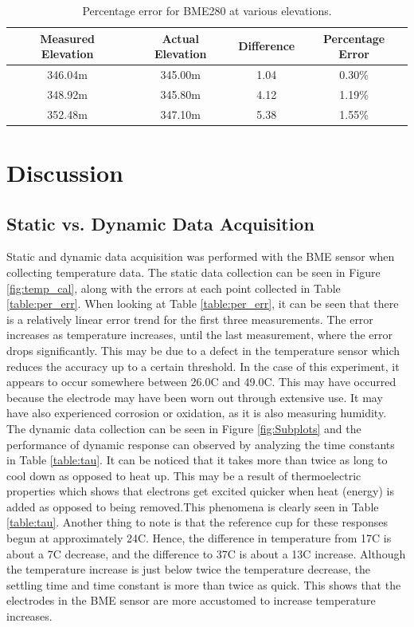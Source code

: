 \documentclass[11pt]{article}
\begin{document}
	\begin{table}[ht]
    \caption{Percentage error for BME280 at various elevations.}
	\vspace{3mm}
	\centering
	\begin{tabular}{cccc}
	\hline
		Measured Elevation & Actual Elevation & Difference & Percentage Error\\
	\hline
		346.04m & 345.00m & 1.04 & 0.30\%\\
		348.92m & 345.80m & 4.12 & 1.19\%\\
		352.48m & 347.10m & 5.38 & 1.55\%\\
	\hline
	\end{tabular}
	\label{table:per_err_e}
	\end{table}

\section{Discussion}
\subsection{Static vs. Dynamic Data Acquisition}
Static and dynamic data acquisition was performed with the BME sensor when collecting temperature data. The static data collection can be seen in Figure \ref{fig:temp_cal}, along with the errors at each point collected in Table \ref{table:per_err}. When looking at Table \ref{table:per_err}, it can be seen that there is a relatively linear error trend for the first three measurements. The error increases as temperature increases, until the last measurement, where the error drops significantly. This may be due to a defect in the temperature sensor which reduces the accuracy up to a certain threshold. In the case of this experiment, it appears to occur somewhere between 26.0\textdegree C and 49.0\textdegree C. This may have occurred because the electrode may have been worn out through extensive use. It may have also experienced corrosion or oxidation, as it is also measuring humidity. \\

The dynamic data collection can be seen in Figure \ref{fig:Subplots} and the performance of dynamic response can observed by analyzing the time constants in Table \ref{table:tau}. It can be noticed that it takes more than twice as long to cool down as opposed to heat up. This may be a result of thermoelectric properties which shows that electrons get excited quicker when heat (energy) is added as opposed to being removed.This phenomena is clearly seen in Table \ref{table:tau}. Another thing to note is that the reference cup for these responses begun at approximately 24\textdegree C. Hence, the difference in temperature from 17\textdegree C is about a 7\textdegree C decrease, and the difference to 37\textdegree C is about a 13\textdegree C increase. Although the temperature increase is just below twice the temperature decrease, the settling time and time constant is more than twice as quick. This shows that the electrodes in the BME sensor are more accustomed to increase temperature increases. \\ 
\end{document}
